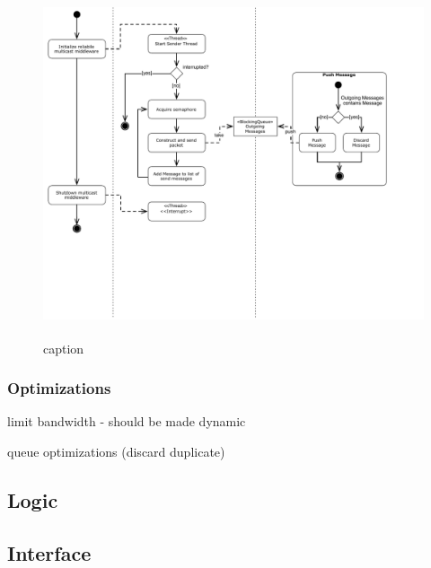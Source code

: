 \begin{figure}[htbp]
    \centering
        \includegraphics[height=4in]{figures/sendMessage.pdf}
    \caption{caption}
    \label{fig:figures_processMessages}
\end{figure}

\subsubsection{Optimizations}

limit bandwidth 
    - should be made dynamic
    
queue optimizations (discard duplicate)

\subsection{Logic}


\subsection{Interface}